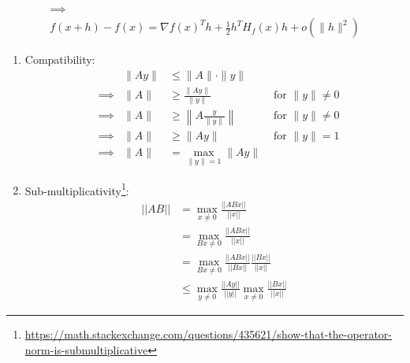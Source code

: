 \documentclass{article}
\begin{document}
\begin{tasks}
\begin{enumerate}
\begin{displaymath}
\begin{gathered}
                        \implies \\
                        f(x + h) - f(x) = \nabla f(x)^T h + \frac{1}{2}h^T H_f(x)h + o(\|h\|^2)
                    \end{gathered}
                  \end{displaymath}
        \end{enumerate}
        \item \begin{multicols}{2}
            \begin{enumerate} \footnotesize
            \item Compatibility:
                  \begin{displaymath}
                    \begin{aligned}
                        &&\|Ay\| &\le \|A\| \cdot \|y\| \\
                        &\implies&\|A\| &\ge \frac{\|Ay\|}{\|y\|} & \text{ for } \|y\| \ne 0 \\
                        &\implies&\|A\| &\ge \left\|A\frac{y}{\|y\|}\right\| & \text{ for } \|y\| \ne 0 \\
                        &\implies&\|A\| &\ge \left\|Ay\right\| & \text{ for } \|y\| = 1 \\
                        &\implies&\|A\| &= \max_{\|y\| = 1} \|Ay\|
                    \end{aligned}
                  \end{displaymath}
            \item Sub-multiplicativity\footnote{\url{https://math.stackexchange.com/questions/435621/show-that-the-operator-norm-is-submultiplicative}}:
                  \begin{displaymath}
                    \begin{aligned}
                        ||AB|| 
                        &= \max_{x \ne 0} \frac{||ABx||}{||x||} \\
                        &= \max_{Bx \ne 0}\frac{||ABx|| }{||x||} \\
                        &= \max_{ Bx\ne 0}\frac{||ABx||}{||Bx||} \frac{||Bx||}{||x||} \\
                        &\le \max_{y \ne 0} \frac{||Ay||}{||y||} \max_{x \ne 0} \frac{||Bx||}{||x||}
                    \end{aligned}
                  \end{displaymath}
                  \footnotesize
        \end{enumerate}\end{multicols}
    \end{tasks}
\end{document}
